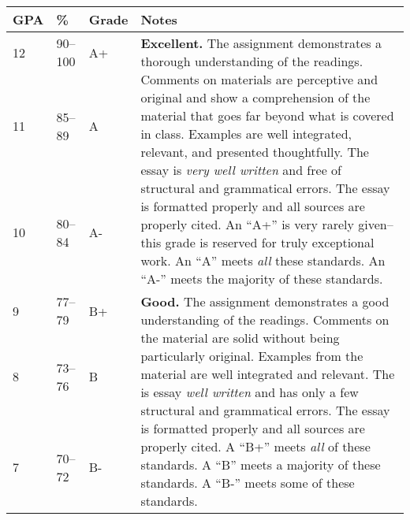 \documentclass[12pt]{article}
\begin{document}
{\footnotesize
\begin{tabular}{|l|l|l|l|}
\hline
\textbf{GPA} & \textbf{\%} & \textbf{Grade} & \textbf{Notes} \\
\hline
\multirow{3}{*}{12} & \multirow{3}{*}{90--100} & \multirow{3}{*}{A+} & \multirow{10}{4in}{\textbf{Excellent.} The assignment demonstrates a thorough understanding of the readings. Comments on materials are perceptive and original and show a comprehension of the material that goes far beyond what is covered in class. Examples are well integrated, relevant, and presented thoughtfully. The essay is \textit{very well written} and free of structural and grammatical errors. The essay is formatted properly and all sources are properly cited. An ``A+'' is very rarely given--this grade is reserved for truly exceptional work. An ``A'' meets \textit{all} these standards. An ``A-'' meets the majority of these standards.} \\ 
& & & \\
& & & \\
\multirow{3}{*}{11} & \multirow{3}{*}{85--89} & \multirow{3}{*}{A} & \\
& & & \\
& & & \\
\multirow{3}{*}{10} & \multirow{3}{*}{80--84} & \multirow{3}{*}{A-} & \\ 
& & & \\
& & & \\
& & & \\
\hline
\multirow{3}{*}{9} & \multirow{3}{*}{77--79} & \multirow{3}{*}{B+} & \multirow{9}{4in}{\textbf{Good.} The assignment demonstrates a good understanding of the readings. Comments on the material are solid without being particularly original. Examples from the material are well integrated and relevant. The is essay \textit{well written} and has only a few structural and grammatical errors. The essay is formatted properly and all sources are properly cited. A ``B+'' meets \textit{all} of these standards. A ``B'' meets a majority of these standards. A ``B-'' meets some of these standards.}\\
& & & \\
& & & \\
\multirow{3}{*}{8} & \multirow{3}{*}{73--76} & \multirow{3}{*}{B} & \\
& & & \\
& & & \\
\multirow{3}{*}{7} & \multirow{3}{*}{70--72} & \multirow{3}{*}{B-} & \\
& & & \\

\end{tabular}}
\end{document}
